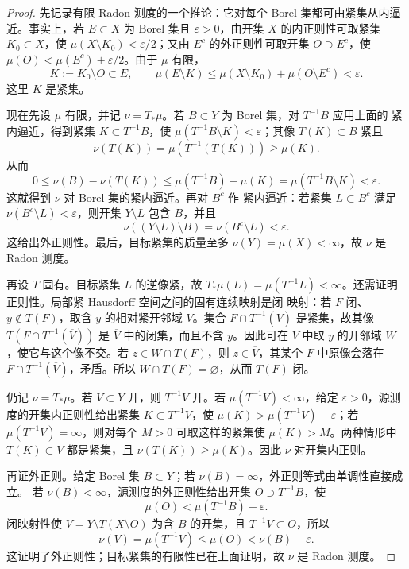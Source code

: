 \begin{proof}
先记录有限 Radon 测度的一个推论：它对每个 Borel 集都可由紧集从内逼近。事实上，若
$E\subset X$ 为 Borel 集且 $\varepsilon>0$，由开集 $X$ 的内正则性可取紧集 $K_0\subset X$，使
$\mu(X\setminus K_0)<\varepsilon/2$；又由 $E^c$ 的外正则性可取开集 $O\supset E^c$，使
$\mu(O)<\mu(E^c)+\varepsilon/2$。由于 $\mu$ 有限，
\[
 K:=K_0\setminus O\subset E,\qquad
 \mu(E\setminus K)
 \le \mu(X\setminus K_0)+\mu(O\setminus E^c)<\varepsilon.
\]
这里 $K$ 是紧集。

现在先设 $\mu$ 有限，并记 $\nu=T_*\mu$。若 $B\subset Y$ 为 Borel 集，对 $T^{-1}B$ 应用上面的
紧内逼近，得到紧集 $K\subset T^{-1}B$，使
$\mu(T^{-1}B\setminus K)<\varepsilon$；其像 $T(K)\subset B$ 紧且
\[
 \nu(T(K))=\mu(T^{-1}(T(K)))\ge\mu(K).
\]
从而
\[
 0\le \nu(B)-\nu(T(K))
 \le \mu(T^{-1}B)-\mu(K)
 =\mu(T^{-1}B\setminus K)<\varepsilon.
\]
这就得到 $\nu$ 对 Borel 集的紧内逼近。再对 $B^c$ 作
紧内逼近：若紧集 $L\subset B^c$ 满足 $\nu(B^c\setminus L)<\varepsilon$，则开集
$Y\setminus L$ 包含 $B$，并且
\[
 \nu((Y\setminus L)\setminus B)=\nu(B^c\setminus L)<\varepsilon.
\]
这给出外正则性。最后，目标紧集的质量至多 $\nu(Y)=\mu(X)<\infty$，故 $\nu$ 是 Radon 测度。

再设 $T$ 固有。目标紧集 $L$ 的逆像紧，故
$T_*\mu(L)=\mu(T^{-1}L)<\infty$。还需证明正则性。局部紧 Hausdorff 空间之间的固有连续映射是闭
映射：若 $F$ 闭、$y\notin T(F)$，取含 $y$ 的相对紧开邻域 $V$。集合
$F\cap T^{-1}(\overline V)$ 是紧集，故其像
$T(F\cap T^{-1}(\overline V))$ 是 $\overline V$ 中的闭集，而且不含 $y$。因此可在 $V$ 中取
$y$ 的开邻域 $W$，使它与这个像不交。若 $z\in W\cap T(F)$，则
$z\in\overline V$，其某个 $F$ 中原像会落在 $F\cap T^{-1}(\overline V)$，矛盾。所以
$W\cap T(F)=\varnothing$，从而 $T(F)$ 闭。

仍记 $\nu=T_*\mu$。若 $V\subset Y$ 开，则 $T^{-1}V$ 开。若
$\mu(T^{-1}V)<\infty$，给定 $\varepsilon>0$，源测度的开集内正则性给出紧集
$K\subset T^{-1}V$，使 $\mu(K)>\mu(T^{-1}V)-\varepsilon$；若
$\mu(T^{-1}V)=\infty$，则对每个 $M>0$ 可取这样的紧集使 $\mu(K)>M$。两种情形中
$T(K)\subset V$ 都是紧集，且 $\nu(T(K))\ge\mu(K)$。因此 $\nu$ 对开集内正则。

再证外正则。给定 Borel 集 $B\subset Y$；若 $\nu(B)=\infty$，外正则等式由单调性直接成立。
若 $\nu(B)<\infty$，源测度的外正则性给出开集 $O\supset T^{-1}B$，使
\[
 \mu(O)<\mu(T^{-1}B)+\varepsilon.
\]
闭映射性使
$V=Y\setminus T(X\setminus O)$ 为含 $B$ 的开集，且 $T^{-1}V\subset O$，所以
\[
 \nu(V)=\mu(T^{-1}V)\le\mu(O)<\nu(B)+\varepsilon.
\]
这证明了外正则性；目标紧集的有限性已在上面证明，故 $\nu$ 是 Radon 测度。
\end{proof}

